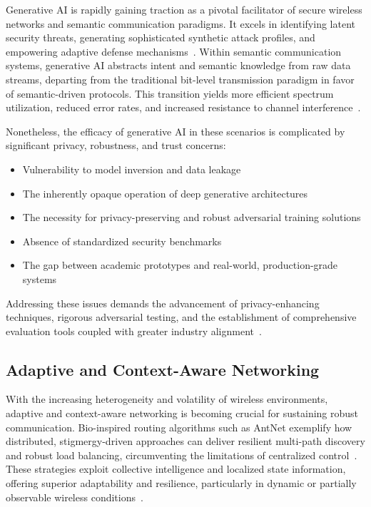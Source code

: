 \documentclass[sigconf]{acmart}
\begin{document}
Generative AI is rapidly gaining traction as a pivotal facilitator of secure wireless networks and semantic communication paradigms. It excels in identifying latent security threats, generating sophisticated synthetic attack profiles, and empowering adaptive defense mechanisms~\cite{ref15,ref26,ref44}. Within semantic communication systems, generative AI abstracts intent and semantic knowledge from raw data streams, departing from the traditional bit-level transmission paradigm in favor of semantic-driven protocols. This transition yields more efficient spectrum utilization, reduced error rates, and increased resistance to channel interference~\cite{ref15,ref26,ref44}.

Nonetheless, the efficacy of generative AI in these scenarios is complicated by significant privacy, robustness, and trust concerns:
\begin{itemize}
    \item Vulnerability to model inversion and data leakage
    \item The inherently opaque operation of deep generative architectures
    \item The necessity for privacy-preserving and robust adversarial training solutions
    \item Absence of standardized security benchmarks
    \item The gap between academic prototypes and real-world, production-grade systems
\end{itemize}
Addressing these issues demands the advancement of privacy-enhancing techniques, rigorous adversarial testing, and the establishment of comprehensive evaluation tools coupled with greater industry alignment~\cite{ref46,ref49}.

\subsection{Adaptive and Context-Aware Networking}

With the increasing heterogeneity and volatility of wireless environments, adaptive and context-aware networking is becoming crucial for sustaining robust communication. Bio-inspired routing algorithms such as AntNet exemplify how distributed, stigmergy-driven approaches can deliver resilient multi-path discovery and robust load balancing, circumventing the limitations of centralized control~\cite{ref30}. These strategies exploit collective intelligence and localized state information, offering superior adaptability and resilience, particularly in dynamic or partially observable wireless conditions~\cite{ref30}.
\end{document}
